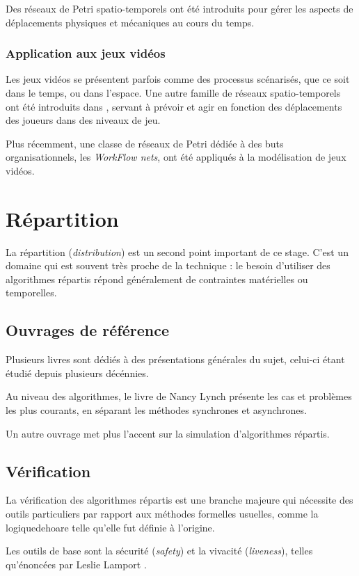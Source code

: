 Des réseaux de Petri spatio-temporels ont été introduits\cite{zhang2014modeling} pour gérer les aspects de déplacements physiques et mécaniques au cours du temps.

\subsubsection{Application aux jeux vidéos}
Les jeux vidéos se présentent parfois comme des processus scénarisés, que ce soit dans le temps, ou dans l'espace.
Une autre famille de réseaux spatio-temporels ont été introduits dans \cite{natkin2004new}, servant à prévoir et agir en fonction des déplacements des joueurs dans des niveaux de jeu.

Plus récemment, une classe de réseaux de Petri dédiée à des buts organisationnels, les \textit{WorkFlow nets}\cite{oliveira2011game}, ont été appliqués à la modélisation de jeux vidéos.
\section{Répartition}
La répartition (\textit{distribution}) est un second point important de ce stage. C'est un domaine qui est souvent très proche de la technique : le besoin d'utiliser des algorithmes répartis répond généralement de contraintes matérielles ou temporelles.

\subsection{Ouvrages de référence}
Plusieurs livres sont dédiés à des présentations générales du sujet, celui-ci étant étudié depuis plusieurs décénnies.

Au niveau des algorithmes, le livre de Nancy Lynch \cite{lynch1996distributed} présente les cas et problèmes les plus courants, en séparant les méthodes synchrones et asynchrones. 

Un autre ouvrage \cite{attiya2004distributed} met plus l'accent sur la simulation d'algorithmes répartis.

\subsection{Vérification}
La vérification des algorithmes répartis est une branche majeure qui nécessite des outils particuliers par rapport aux méthodes formelles usuelles, comme la \gls{logiquedehoare} telle qu'elle fut définie à l'origine.

Les outils de base sont la sécurité (\textit{safety}) et la vivacité (\textit{liveness}), telles qu'énoncées par Leslie Lamport \cite{lamport1977proving}.

